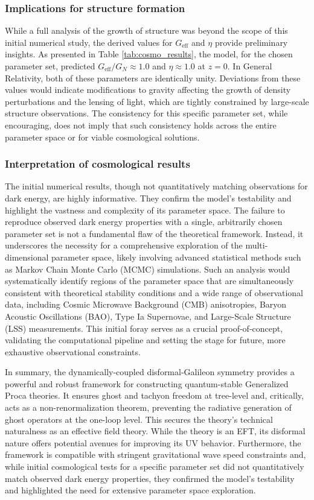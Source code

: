 \documentclass[twocolumn]{aastex631}
\begin{document}
\subsubsection{Implications for structure formation}
While a full analysis of the growth of structure was beyond the scope of this initial numerical study, the derived values for $G_{\text{eff}}$ and $\eta$ provide preliminary insights. As presented in Table \ref{tab:cosmo_results}, the model, for the chosen parameter set, predicted $G_{\text{eff}}/G_N \approx 1.0$ and $\eta \approx 1.0$ at $z=0$. In General Relativity, both of these parameters are identically unity. Deviations from these values would indicate modifications to gravity affecting the growth of density perturbations and the lensing of light, which are tightly constrained by large-scale structure observations. The consistency for this specific parameter set, while encouraging, does not imply that such consistency holds across the entire parameter space or for viable cosmological solutions.

\subsubsection{Interpretation of cosmological results}
The initial numerical results, though not quantitatively matching observations for dark energy, are highly informative. They confirm the model's testability and highlight the vastness and complexity of its parameter space. The failure to reproduce observed dark energy properties with a single, arbitrarily chosen parameter set is not a fundamental flaw of the theoretical framework. Instead, it underscores the necessity for a comprehensive exploration of the multi-dimensional parameter space, likely involving advanced statistical methods such as Markov Chain Monte Carlo (MCMC) simulations. Such an analysis would systematically identify regions of the parameter space that are simultaneously consistent with theoretical stability conditions and a wide range of observational data, including Cosmic Microwave Background (CMB) anisotropies, Baryon Acoustic Oscillations (BAO), Type Ia Supernovae, and Large-Scale Structure (LSS) measurements. This initial foray serves as a crucial proof-of-concept, validating the computational pipeline and setting the stage for future, more exhaustive observational constraints.

In summary, the dynamically-coupled disformal-Galileon symmetry provides a powerful and robust framework for constructing quantum-stable Generalized Proca theories. It ensures ghost and tachyon freedom at tree-level and, critically, acts as a non-renormalization theorem, preventing the radiative generation of ghost operators at the one-loop level. This secures the theory's technical naturalness as an effective field theory. While the theory is an EFT, its disformal nature offers potential avenues for improving its UV behavior. Furthermore, the framework is compatible with stringent gravitational wave speed constraints and, while initial cosmological tests for a specific parameter set did not quantitatively match observed dark energy properties, they confirmed the model's testability and highlighted the need for extensive parameter space exploration.
\end{document}
